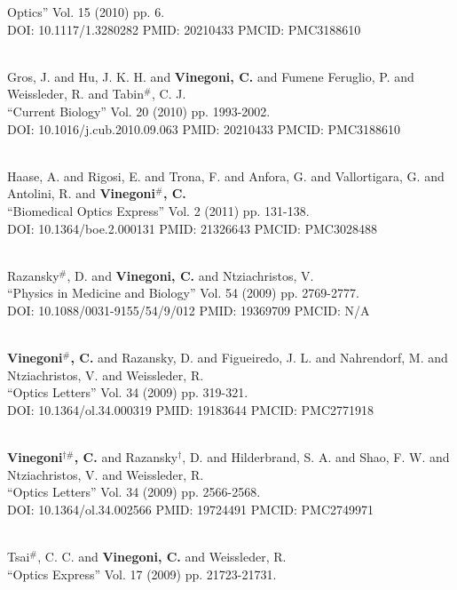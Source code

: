 Optics'' Vol. 15 (2010) pp. 6. \\ DOI: 10.1117/1.3280282 PMID: 20210433 PMCID: PMC3188610\item {} \\ Gros, J. and Hu, J. K. H. and {\bf Vinegoni, C.} and Fumene Feruglio, P. and Weissleder, R. and Tabin$^\#$, C. J. \\ ``Current Biology'' Vol. 20 (2010) pp. 1993-2002. \\ DOI: 10.1016/j.cub.2010.09.063 PMID: 20210433 PMCID: PMC3188610\item {} \\ Haase, A. and Rigosi, E. and Trona, F. and Anfora, G. and Vallortigara, G. and Antolini, R. and {\bf Vinegoni$^\#$, C.} \\ ``Biomedical Optics Express'' Vol. 2 (2011) pp. 131-138. \\ DOI: 10.1364/boe.2.000131 PMID: 21326643 PMCID: PMC3028488\item {} \\ Razansky$^\#$, D. and {\bf Vinegoni, C.} and Ntziachristos, V. \\ ``Physics in Medicine and Biology'' Vol. 54 (2009) pp. 2769-2777. \\ DOI: 10.1088/0031-9155/54/9/012 PMID: 19369709 PMCID: N/A\item {} \\ {\bf Vinegoni$^\#$, C.} and Razansky, D. and Figueiredo, J. L. and Nahrendorf, M. and Ntziachristos, V. and Weissleder, R. \\ ``Optics Letters'' Vol. 34 (2009) pp. 319-321. \\ DOI: 10.1364/ol.34.000319 PMID: 19183644 PMCID: PMC2771918\item {} \\ {\bf Vinegoni$^{\dag \#}$, C.} and Razansky$^\dag$, D. and Hilderbrand, S. A. and Shao, F. W. and Ntziachristos, V. and Weissleder, R. \\ ``Optics Letters'' Vol. 34 (2009) pp. 2566-2568. \\ DOI: 10.1364/ol.34.002566 PMID: 19724491 PMCID: PMC2749971\item {} \\ Tsai$^\#$, C. C. and {\bf Vinegoni, C.} and Weissleder, R. \\ ``Optics Express'' Vol. 17 (2009) pp. 21723-21731. \\ 